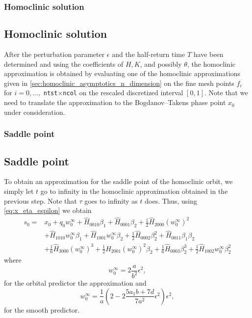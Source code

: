 \ifthesis
\subsubsection{Homoclinic solution}
\else
\subsection{Homoclinic solution}
\fi
After the perturbation parameter $\epsilon$ and the half-return time $T$ have
been determined and using the coefficients of $H,K$, and possibly $\theta$, the
homoclinic approximation is obtained by evaluating one of the homoclinic
approximations given in \cref{sec:homoclinic_asymptotics_n_dimension} on the
fine mesh points $f_i$ for $i=0,\dots,$ \texttt{ntst}$\times$\texttt{ncol} on the
rescaled discretized interval $[0,1]$.  Note that we need to translate the
approximation to the Bogdanov--Takens phase point $x_0$ under consideration.

\ifthesis
\subsubsection{Saddle point}
\else
\subsection{Saddle point}
\fi
To obtain an approximation for the saddle point of the homoclinic orbit, we
simply let $t$ go to infinity in the homoclinic approximation obtained in the
previous step. Note that $\tau$ goes to infinity as $t$ does. Thus, using
\cref{eq:x_eta_espilon} we obtain
\begin{equation*}
\begin{aligned}
    s_0 ={}& x_0 + q_0 w_0^{\infty} + \hat H_{0010} \beta_1 + \hat H_{0001} \beta_2 +
            \frac{1}{2} \hat H_{2000} \left(w_0^{\infty}\right)^2  \\
           & + \hat H_{1010} w_0^{\infty} \beta_1 + \hat H_{1001} w_0^{\infty} \beta_2 +
             \frac{1}{2} \hat H_{0002} \beta_2^2 + \hat H_{0011} \beta_1 \beta_2 \\
           & + \frac{1}{6} \hat H_{3000} \left(w_0^{\infty}\right)^3 +
             \frac{1}{2} \hat H_{2001} \left(w_0^{\infty}\right)^2 \beta_2 
             + \frac{1}{6} \hat H_{0003} \beta_2^3 + \frac{1}{2} \hat H_{1002} w_0^{\infty} \beta_2^2
\end{aligned}
\end{equation*}
where
\[
  w_0^\infty = 2\frac{a}{b^2} \epsilon^2,
\] 
for the orbital predictor the approximation and
\[
    w_0^\infty = \frac1a \left( 2 - 2 \frac{5 a_1 b + 7 d}{7a^2} \epsilon^2
    \right) \epsilon^2,
\] 
for the smooth predictor.

